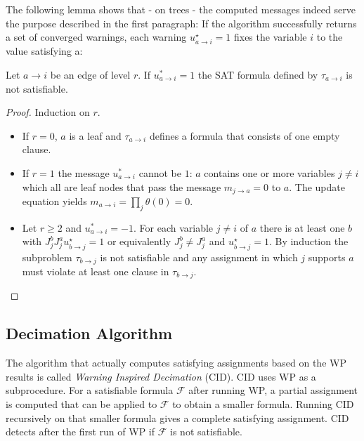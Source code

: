 The following lemma shows that - on trees - the computed messages indeed serve the purpose described in the first paragraph: If the algorithm successfully returns a set of converged warnings, each warning $u^{\star}_{a \rightarrow i} = 1$ fixes the variable $i$ to the value satisfying a:

\begin{lemma}\cite{survprob} Let $a \rightarrow i$ be an edge of level $r$. \newline
If $u^{\ast}_{a \rightarrow i} = 1$ the SAT formula defined by $\tau_{a \rightarrow i}$ is not satisfiable.

\begin{proof} Induction on $r$.
\begin{itemize}
	\item If $r = 0$, $a$ is a leaf and $\tau_{a \rightarrow i}$ defines a formula that consists of one empty clause.
	\item If $r = 1$ the message $u^{\ast}_{a \rightarrow i}$ cannot be $1$: $a$ contains one or more variables $j \neq i$ which all are leaf nodes that pass the message $m_{j \rightarrow a} = 0$ to $a$. The update equation yields $m_{a \rightarrow i} = \prod_j \theta(0) = 0$.
	\item Let $r \geq 2$ and $u^{\ast}_{a \rightarrow i} = -1$. For each variable $j \neq i$ of $a$ there is at least one $b$ with $J_j^b J_j^a u^\star_{b \rightarrow j}= 1$ or equivalently $J_j^b \neq J_j^a$ and  $u^\star_{b \rightarrow j} = 1$. By induction the subproblem $\tau_{b \rightarrow j}$ is not satisfiable and any assignment in which $j$ supports $a$ must violate at least one clause in $\tau_{b \rightarrow j}$.
\end{itemize}
\end{proof}
\end{lemma}



\subsection{Decimation Algorithm}

The algorithm that actually computes satisfying assignments based on the WP results is called \emph{Warning Inspired Decimation} (CID). CID uses WP as a subprocedure. For a satisfiable formula $\mathcal{F}$ after running WP, a partial assignment is computed that can be applied to $\mathcal{F}$ to obtain a smaller formula. Running CID recursively on that smaller formula gives a complete satisfying assignment. CID detects after the first run of WP if $\mathcal{F}$ is not satisfiable. \newline

